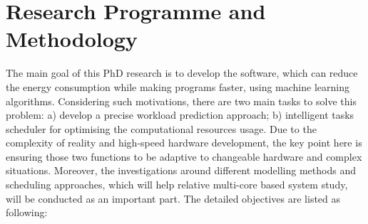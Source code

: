 \section{Research Programme and Methodology}

The main goal of this PhD research is to develop the software, which can reduce the energy consumption while making programs faster, using machine learning algorithms. Considering such motivations, there are two main tasks to solve this problem: a) develop a precise workload prediction approach; b) intelligent tasks scheduler for optimising the computational resources usage. Due to the complexity of reality and high-speed hardware development, the key point here is ensuring those two functions to be adaptive to changeable hardware and complex situations. Moreover, the investigations around different modelling methods and scheduling approaches, which will help relative multi-core based system study, will be conducted as an important part. The detailed objectives are listed as following:

